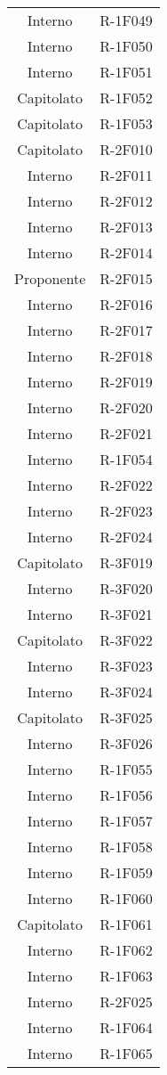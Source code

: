 \begin{tabularx}{\textwidth}{c|c}
		Interno & R-1F049 \\
		Interno & R-1F050 \\
		Interno & R-1F051 \\
		Capitolato & R-1F052 \\
		Capitolato & R-1F053 \\
		Capitolato & R-2F010 \\
		Interno & R-2F011 \\
		Interno & R-2F012 \\
		Interno & R-2F013 \\
		Interno & R-2F014 \\
		Proponente & R-2F015 \\
		Interno & R-2F016 \\
		Interno & R-2F017 \\
		Interno & R-2F018 \\
		Interno & R-2F019 \\
		Interno & R-2F020 \\
		Interno & R-2F021 \\
		Interno & R-1F054 \\
		Interno & R-2F022 \\
		Interno & R-2F023 \\
		Interno & R-2F024 \\
		Capitolato & R-3F019 \\
		Interno & R-3F020 \\
		Interno & R-3F021 \\
		Capitolato & R-3F022 \\
		Interno & R-3F023 \\
		Interno & R-3F024 \\
		Capitolato & R-3F025 \\
		Interno & R-3F026 \\
		Interno & R-1F055 \\
		Interno & R-1F056 \\
		Interno & R-1F057 \\
		Interno & R-1F058 \\
		Interno & R-1F059 \\
		Interno & R-1F060 \\
		Capitolato & R-1F061 \\
		Interno & R-1F062 \\
		Interno & R-1F063 \\
		Interno & R-2F025 \\
		Interno & R-1F064 \\
		Interno & R-1F065 \\

\end{tabularx}
